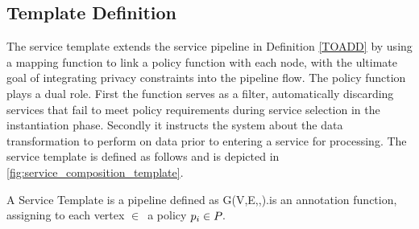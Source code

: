\subsection{Template Definition}
The service template extends the service pipeline in Definition \ref{TOADD} by using a mapping function to link a policy function with each node, with the ultimate goal of integrating privacy constraints into the pipeline flow.
The policy function plays a dual role.
First the function serves as a filter, automatically discarding services that fail to meet policy requirements during service selection in the instantiation phase. Secondly
it instructs the system about the data transformation to perform on data prior to entering a service for processing.
The service template is defined as follows and is depicted in \cref{fig:service_composition_template}.



\begin{definition} \label{def:pipeline}
  A Service Template is a pipeline defined as G(V,E,\myLambda,\myGamma).\myGamma is an annotation function, assigning to each vertex $\in$\V\ a policy $p_i\in P_{}$.

\end{definition}


